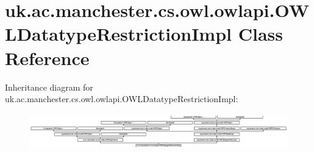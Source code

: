 \hypertarget{classuk_1_1ac_1_1manchester_1_1cs_1_1owl_1_1owlapi_1_1_o_w_l_datatype_restriction_impl}{\section{uk.\-ac.\-manchester.\-cs.\-owl.\-owlapi.\-O\-W\-L\-Datatype\-Restriction\-Impl Class Reference}
\label{classuk_1_1ac_1_1manchester_1_1cs_1_1owl_1_1owlapi_1_1_o_w_l_datatype_restriction_impl}
}
Inheritance diagram for uk.\-ac.\-manchester.\-cs.\-owl.\-owlapi.\-O\-W\-L\-Datatype\-Restriction\-Impl\-:\begin{figure}[H]
\begin{center}
\leavevmode
\includegraphics[height=1.542700cm]{classuk_1_1ac_1_1manchester_1_1cs_1_1owl_1_1owlapi_1_1_o_w_l_datatype_restriction_impl}
\end{center}
\end{figure}
